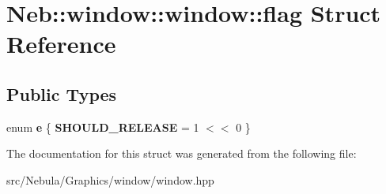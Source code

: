 \hypertarget{structNeb_1_1window_1_1window_1_1flag}{\section{\-Neb\-:\-:window\-:\-:window\-:\-:flag \-Struct \-Reference}
\label{structNeb_1_1window_1_1window_1_1flag}
}
\subsection*{\-Public \-Types}
\begin{DoxyCompactItemize}
\item 
enum {\bfseries e} \{ {\bfseries \-S\-H\-O\-U\-L\-D\-\_\-\-R\-E\-L\-E\-A\-S\-E} =  1 $<$$<$ 0
 \}
\end{DoxyCompactItemize}


\-The documentation for this struct was generated from the following file\-:\begin{DoxyCompactItemize}
\item 
src/\-Nebula/\-Graphics/window/window.\-hpp\end{DoxyCompactItemize}
